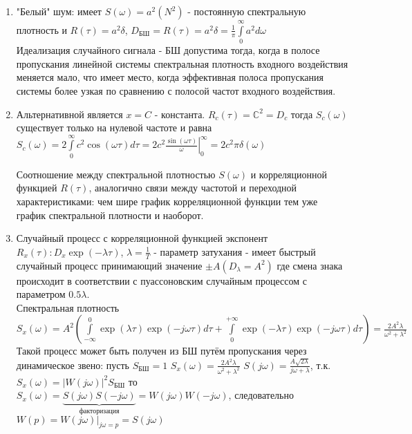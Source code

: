 \documentclass[preprint,russian,a5paper,10pt,twoside,mediummath]{ncc}
\begin{document}
\begin{enumerate}
\item "Белый" шум: имеет $S\left( \omega  \right)={{a}^{2}}\left( {{N}^{2}} \right)$ - постоянную спектральную плотность и $R\left( \tau  \right)={{a}^{2}}\delta $, ${{D}_{\text{БШ}}}=R\left( \tau  \right)={{a}^{2}}\delta =\frac{1}{\pi }\int\limits_{0}^{\infty }{{{a}^{2}}}d\omega $ 
\\Идеализация  случайного сигнала - БШ допустима тогда, когда в полосе пропускания линейной системы спектральная плотность входного воздействия меняется мало, что имеет место, когда эффективная полоса пропускания системы более узкая по сравнению с полосой частот входного воздействия.
\item Альтернативной является $x=C$ - константа. ${{R}_{c}}\left( \tau  \right)={{\mathbb{C}}^{2}}={{D}_{c}}$ тогда ${{S}_{c}}\left( \omega  \right)$ существует только на нулевой частоте и равна  
${{S}_{c}}\left( \omega  \right)=2\int\limits_{0}^{\infty }{{{c}^{2}}}\cos \left( \omega \tau  \right)d\tau =\left. 2{{c}^{2}}\frac{\sin \left( \omega \tau  \right)}{\omega } \right|_{0}^{\infty }=2{{c}^{2}}\pi \delta \left( \omega  \right)$
\par Соотношение между спектральной плотностью $S\left( \omega  \right)$ и корреляционной функцией $R\left( \tau  \right)$, аналогично связи между частотой и переходной характеристиками: чем шире график корреляционной функции тем уже график спектральной плотности и наоборот.
\item Случайный процесс с корреляционной функцией экспонент ${{R}_{x}}\left( \tau  \right):{{D}_{x}}\exp \left( -\lambda \tau  \right)$, $\lambda =\frac{1}{T}$ - параметр затухания - имеет быстрый случайный процесс принимающий значение $\pm A\left( {{D}_{\lambda }}={{A}^{2}} \right)$ где смена знака происходит в соответствии с пуассоновским случайным процессом с параметром $0.5\lambda $.
\\Спектральная плотность ${{S}_{x}}\left( \omega  \right)={{A}^{2}}\left( \int\limits_{-\infty }^{0}{\exp \left( \lambda \tau  \right)\exp \left( -j\omega \tau  \right)d\tau +\int\limits_{0}^{+\infty }{\exp \left( -\lambda \tau  \right)\exp \left( -j\omega \tau  \right)d\tau }} \right)=\frac{2{{A}^{2}}\lambda }{{{\omega }^{2}}+{{\lambda }^{2}}}$
\\Такой процесс может быть получен из БШ путём пропускания через динамическое звено: пусть ${{S}_{\text{БШ}}}=1$ ${{S}_{x}}\left( \omega  \right)=\frac{2{{A}^{2}}\lambda }{{{\omega }^{2}}+{{\lambda }^{2}}}$ $S\left( j\omega  \right)=\frac{A\sqrt{2\lambda }}{j\omega +\lambda }$, т.к.  ${{S}_{x}}\left( \omega  \right)={{\left| W\left( j\omega  \right) \right|}^{2}}{{S}_{БШ}}$ то ${{S}_{x}}\left( \omega  \right)=\underbrace{S\left( j\omega  \right)S\left( -j\omega  \right)}_{\text{факторизация}}=W\left( j\omega  \right)W\left( -j\omega  \right)$, следовательно $W\left( p \right)={{\left. W\left( j\omega  \right) \right|}_{j\omega =p}}=S\left( j\omega  \right)$ 
\end{enumerate}
\end{document}
